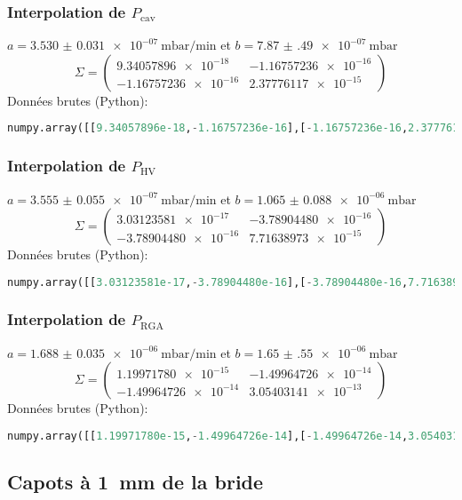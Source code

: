 \subsubsection{Interpolation de $P_\text{cav}$}
$a = \SI{+3.530(31)e-07}{\milli\bar\per\minute}$ et $b = \SI{+7.87(49)e-07}{\milli\bar}$
\[
\Sigma = \left(
\begin{matrix}
\num{9.34057896e-18} & \num{-1.16757236e-16}\\
\num{-1.16757236e-16} & \num{2.37776117e-15}
\end{matrix}\right)
\]
Données brutes (Python):
\begin{lstlisting}[language = Python]
numpy.array([[9.34057896e-18,-1.16757236e-16],[-1.16757236e-16,2.37776117e-15]])
\end{lstlisting}

\subsubsection{Interpolation de $P_\text{HV}$}
$a = \SI{+3.555(55)e-07}{\milli\bar\per\minute}$ et $b = \SI{+1.065(88)e-06}{\milli\bar}$
\[
\Sigma = \left(
\begin{matrix}
\num{3.03123581e-17} & \num{-3.78904480e-16}\\
\num{-3.78904480e-16} & \num{7.71638973e-15}
\end{matrix}\right)
\]
Données brutes (Python):
\begin{lstlisting}[language = Python]
numpy.array([[3.03123581e-17,-3.78904480e-16],[-3.78904480e-16,7.71638973e-15]])
\end{lstlisting}

\subsubsection{Interpolation de $P_\text{RGA}$}
$a = \SI{+1.688(35)e-06}{\milli\bar\per\minute}$ et $b = \SI{+1.65(55)e-06}{\milli\bar}$
\[
\Sigma = \left(
\begin{matrix}
\num{1.19971780e-15} & \num{-1.49964726e-14}\\
\num{-1.49964726e-14} & \num{3.05403141e-13}
\end{matrix}\right)
\]
Données brutes (Python):
\begin{lstlisting}[language = Python]
numpy.array([[1.19971780e-15,-1.49964726e-14],[-1.49964726e-14,3.05403141e-13]])
\end{lstlisting}

\subsection{Capots à \SI{1}{\milli\meter} de la bride}

